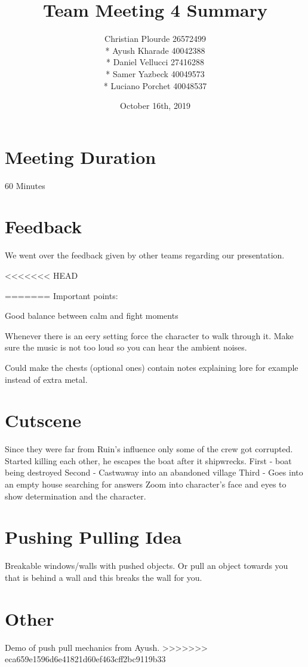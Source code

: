 \documentclass{article}
\begin{document}
\title{Team Meeting 4 Summary}
\author{Christian Plourde 26572499\\*
		Ayush Kharade 40042388\\*
		Daniel Vellucci 27416288\\*
		Samer Yazbeck 40049573\\*
		Luciano Porchet 40048537
		}
\date{October 16th, 2019}

\maketitle

\newpage

\section{Meeting Duration}
60 Minutes

\section{Feedback}
We went over the feedback given by other teams regarding our presentation.

<<<<<<< HEAD


=======
Important points:
\begin{description}
\item Good balance between calm and fight moments
\item Whenever there is an eery setting force the character to walk through it. Make sure the music is not too loud so you can hear the ambient noises.
\item Could make the chests (optional ones) contain notes explaining lore for example instead of extra metal.
\end{description}

\section{Cutscene}
Since they were far from Ruin's influence only some of the crew got corrupted. Started killing each other, he escapes the boat after it shipwrecks. 
First - boat being destroyed
Second - Castwaway into an abandoned village
Third - Goes into an empty house searching for answers
Zoom into character's face and eyes to show determination and the character.

\section{Pushing Pulling Idea}
Breakable windows/walls with pushed objects. Or pull an object towards you that is behind a wall and this breaks the wall for you.

\section{Other}
Demo of push pull mechanics from Ayush.
>>>>>>> eca659e1596d6e41821d60ef463cff2bc9119b33
\end{document}
